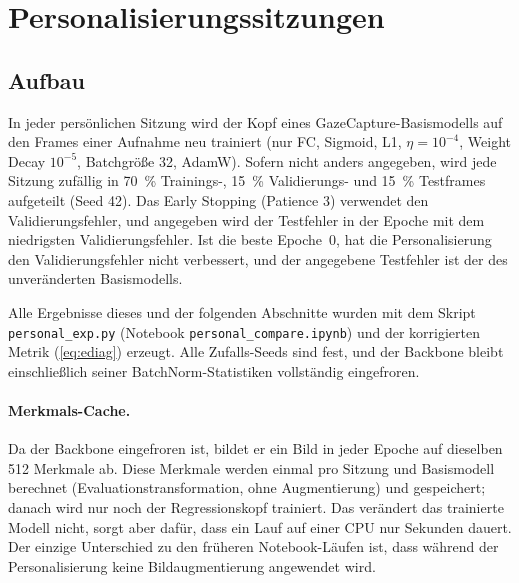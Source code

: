 \documentclass[
  11pt,
  a4paper,
  oneside,
  DIV=12,
  BCOR=8mm,
  parskip=half,
  headings=normal,
  bibliography=totoc,
  listof=totoc
]{scrreprt}
\newcommand{\code}[1]{\texttt{#1}}
\begin{document}
\section{Personalisierungssitzungen}
\label{sec:sessions}

\subsection{Aufbau}
\label{sec:sessions_setup}

In jeder persönlichen Sitzung wird der Kopf eines GazeCapture-Basismodells
auf den Frames einer Aufnahme neu trainiert (nur FC, Sigmoid, L1,
$\eta=10^{-4}$, Weight Decay $10^{-5}$, Batchgröße 32, AdamW). Sofern nicht
anders angegeben, wird jede Sitzung zufällig in \SI{70}{\percent} Trainings-,
\SI{15}{\percent} Validierungs- und \SI{15}{\percent} Testframes aufgeteilt
(Seed 42). Das Early Stopping (Patience 3) verwendet den Validierungsfehler,
und angegeben wird der Testfehler in der Epoche mit dem niedrigsten
Validierungsfehler. Ist die beste Epoche~0, hat die Personalisierung den
Validierungsfehler nicht verbessert, und der angegebene Testfehler ist der des
unveränderten Basismodells.

Alle Ergebnisse dieses und der folgenden Abschnitte wurden mit dem Skript
\code{personal\_exp.py} (Notebook \code{personal\_compare.ipynb}) und der
korrigierten Metrik (\cref{eq:ediag}) erzeugt. Alle Zufalls-Seeds sind fest,
und der Backbone bleibt einschließlich seiner BatchNorm-Statistiken
vollständig eingefroren.

\paragraph{Merkmals-Cache.} Da der Backbone eingefroren ist, bildet er ein
Bild in jeder Epoche auf dieselben 512 Merkmale ab. Diese Merkmale werden
einmal pro Sitzung und Basismodell berechnet (Evaluationstransformation, ohne
Augmentierung) und gespeichert; danach wird nur noch der Regressionskopf
trainiert. Das verändert das trainierte Modell nicht, sorgt aber dafür, dass
ein Lauf auf einer CPU nur Sekunden dauert. Der einzige Unterschied zu den
früheren Notebook-Läufen ist, dass während der Personalisierung keine
Bildaugmentierung angewendet wird.
\end{document}
